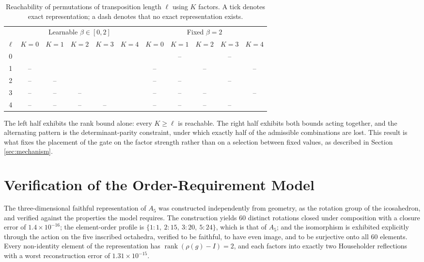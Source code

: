 \begin{table}[ht]
	\caption{Reachability of permutations of transposition length $\ell$ using $K$ factors. A tick denotes exact representation; a dash denotes that no exact representation exists.}
	\centering
	\begin{tabular}{c c c c c c | c c c c c}
		\hline\hline
		& \multicolumn{5}{c|}{Learnable $\beta \in [0,2]$} & \multicolumn{5}{c}{Fixed $\beta = 2$} \\
		$\ell$ & $K{=}0$ & $K{=}1$ & $K{=}2$ & $K{=}3$ & $K{=}4$ & $K{=}0$ & $K{=}1$ & $K{=}2$ & $K{=}3$ & $K{=}4$ \\ [0.5ex]
		\hline
		0 & \checkmark & \checkmark & \checkmark & \checkmark & \checkmark & \checkmark & --         & \checkmark & --         & \checkmark \\
		1 & --         & \checkmark & \checkmark & \checkmark & \checkmark & --         & \checkmark & --         & \checkmark & --         \\
		2 & --         & --         & \checkmark & \checkmark & \checkmark & --         & --         & \checkmark & --         & \checkmark \\
		3 & --         & --         & --         & \checkmark & \checkmark & --         & --         & --         & \checkmark & --         \\
		4 & --         & --         & --         & --         & \checkmark & --         & --         & --         & --         & \checkmark \\ [1ex]
		\hline
	\end{tabular}
	\label{table:reach}
\end{table}

The left half exhibits the rank bound alone: every $K \ge \ell$ is reachable. The
right half exhibits both bounds acting together, and the alternating pattern is
the determinant-parity constraint, under which exactly half of the admissible
combinations are lost. This result is what fixes the placement of the gate on the
factor strength rather than on a selection between fixed values, as described in
Section \ref{sec:mechanism}.

\section{Verification of the Order-Requirement Model}

The three-dimensional faithful representation of $A_5$ was constructed
independently from geometry, as the rotation group of the icosahedron, and
verified against the properties the model requires. The construction yields $60$
distinct rotations closed under composition with a closure error of
$1.4 \times 10^{-16}$; the element-order profile is
$\{1{:}1,\ 2{:}15,\ 3{:}20,\ 5{:}24\}$, which is that of $A_5$; and the
isomorphism is exhibited explicitly through the action on the five inscribed
octahedra, verified to be faithful, to have even image, and to be surjective onto
all $60$ elements. Every non-identity element of the representation has
$\operatorname{rank}(\rho(g) - I) = 2$, and each factors into exactly two
Householder reflections with a worst reconstruction error of
$1.31 \times 10^{-15}$.

